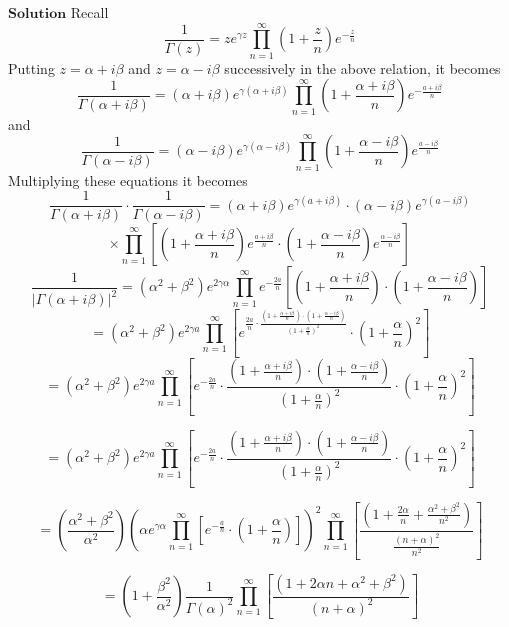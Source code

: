 \documentclass{styles/kaobook}
\begin{document}
$\boxed{\textbf{Solution}}$ Recall 
$$
\frac{1}{\Gamma(z)}=z e^{\gamma z} \prod_{n=1}^{\infty}\left(1+\frac{z}{n}\right) e^{-\frac{z}{n}}
$$
Putting $z=\alpha+i \beta$ and $z=\alpha-i \beta$ successively in the above relation, it becomes
$$
\frac{1}{\Gamma(\alpha+i \beta)}=(\alpha+i \beta) e^{\gamma(\alpha+i \beta)} \prod_{n=1}^{\infty}\left(1+\frac{\alpha+i \beta}{n}\right) e^{-\frac{a+i \beta}{n}}
$$
and 
$$
\frac{1}{\Gamma(\alpha-i \beta)}=(\alpha-i \beta) e^{\gamma(\alpha-i \beta)} \prod_{n=1}^{\infty}\left(1+\frac{\alpha-i \beta}{n}\right) e^{\frac{a-i \beta}{n}}
$$
Multiplying these equations it becomes
$$
\frac{1}{\Gamma(\alpha+i \beta)} \cdot \frac{1}{\Gamma(\alpha-i \beta)}=(\alpha+i \beta) e^{\gamma(a+i \beta)} \cdot(\alpha-i \beta) e^{\gamma(a-i \beta)}$$
$$\times \prod_{n=1}^{\infty}\left[\left(1+\frac{\alpha+i \beta}{n}\right) e^{\frac{a+i \beta}{n}} \cdot\left(1+\frac{\alpha-i \beta}{n}\right) e^{\frac{\alpha-i \beta}{n}}\right]
$$
$$
\frac{1}{|\Gamma(\alpha+i \beta)|^{2}}=\left(\alpha^{2}+\beta^{2}\right) e^{2\gamma \alpha} \prod_{n=1}^{\infty} e^{-\frac{2 a}{n}}\left[\left(1+\frac{\alpha+i \beta}{n}\right) \cdot\left(1+\frac{\alpha-i \beta}{n}\right)\right]
$$
$$
=\left(\alpha^{2}+\beta^{2}\right) e^{2 \gamma a} \prod_{n=1}^{\infty}\left[e^{\frac{2 a}{n} \cdot \frac{\left(1+\frac{\alpha+i \beta}{n}\right) \cdot\left(1+\frac{\alpha-i \beta}{n}\right)}{\left(1+\frac{\alpha}{n}\right)^{2}}} \cdot\left(1+\frac{\alpha}{n}\right)^{2}\right]
$$
$$
=\left(\alpha^{2}+\beta^{2}\right) e^{2 \gamma a} \prod_{n=1}^{\infty}\left[e^{-\frac{2 a}{n}} \cdot \frac{\left(1+\frac{\alpha+i \beta}{n}\right) \cdot\left(1+\frac{\alpha-i \beta}{n}\right)}{\left(1+\frac{\alpha}{n}\right)^{2}} \cdot\left(1+\frac{\alpha}{n}\right)^{2}\right]
$$

$$
=\left(\alpha^{2}+\beta^{2}\right) e^{2 \gamma a} \prod_{n=1}^{\infty}\left[e^{-\frac{2 a}{n}} \cdot \frac{\left(1+\frac{\alpha+i \beta}{n}\right) \cdot\left(1+\frac{\alpha-i \beta}{n}\right)}{\left(1+\frac{\alpha}{n}\right)^{2}} \cdot\left(1+\frac{\alpha}{n}\right)^{2}\right]
$$

$$
=\left(\frac{\alpha^{2}+\beta^{2}}{\alpha^{2}}\right)\left(\alpha e^{\gamma \alpha} \prod_{n=1}^{\infty}\left[e^{-\frac{a}{n}} \cdot\left(1+\frac{\alpha}{n}\right)\right]\right)^{2} \prod_{n=1}^{\infty}\left[\frac{\left(1+\frac{2 \alpha}{n}+\frac{\alpha^{2}+\beta^{2}}{n^{2}}\right)}{\frac{(n+\alpha)^{2}}{n^{2}}}\right]
$$


$$
=\left(1+\frac{\beta^{2}}{\alpha^{2}}\right) \frac{1}{\Gamma(\alpha)^{2}} \prod_{n=1}^{\infty}\left[\frac{\left(1+2 \alpha n+\alpha^{2}+\beta^{2}\right)}{(n+\alpha)^{2}}\right]
$$
\end{document}
